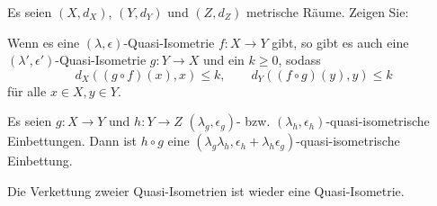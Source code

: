 \documentclass[11pt]{book}
\numberwithin{dummy}{section}
\theoremstyle{nonumberbreak}
\newenvironment{prob}[1][]{\ifthenelse{\equal{#1}{}}{\problem}{\problem[#1]}\rm}{\endproblem}
\newenvironment{sol}[1][]{\ifthenelse{\equal{#1}{}}{\solution}{\solution[#1]}\rm}{\endsolution}
\newcommand{\la}{\longrightarrow}
\begin{document}
\begin{spacing}{1.4}
\begin{prob}
\begin{sol}
\begin{compactenum}
\end{compactenum}

\end{sol}

\end{prob}







\begin{prob}   %
Es seien $(X,d_X)$, $(Y,d_Y)$ und $(Z,d_Z)$ metrische Räume. Zeigen Sie:
\begin{compactenum}
\item Wenn es eine $(\lambda, \epsilon)$-Quasi-Isometrie $f: X \la Y$ gibt, so gibt es auch eine $(\lambda', \epsilon')$-Quasi-Isometrie $g:Y \la X$ und ein $k \geqslant 0$, sodass
$$d_X((g\circ f)(x),x) \leqslant k, \qquad d_Y((f\circ g)(y),y) \leqslant k$$
für alle $x \in X, y \in Y$.
\item Es seien $g:X \la Y$ und $h: Y \la Z$ $(\lambda_g,\epsilon_g)$- bzw. $(\lambda_h,\epsilon_h)$-quasi-isometrische Einbettungen. Dann ist $h\circ g$ eine $(\lambda_g \lambda_h, \epsilon_h + \lambda_h \epsilon_g)$-quasi-isometrische Einbettung.
\item Die Verkettung zweier Quasi-Isometrien ist wieder eine Quasi-Isometrie.
\end{compactenum}


\end{prob}
\end{spacing}
\end{document}
